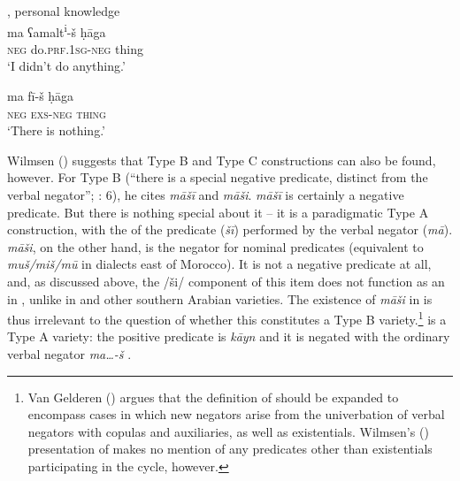 \documentclass[output=paper]{langsci/langscibook}
\begin{document}
\ea\label{cair}
{ , personal knowledge} \\
\ea\gll ma ʕamalt\textsuperscript{i}{}-š ḥāga\\
     \textsc{neg} do.\textsc{prf.1sg-neg} thing  \\
\glt ‘I didn’t do anything.’

\ex\gll ma fī-š ḥāga\\
     \textsc{neg} \textsc{exs-neg} \textsc{\textup{thing}}\\
\glt  ‘There is nothing.’
\z
\z

Wilmsen (\citeyear[173–175]{Wilmsen2014}) suggests that Type B and Type C constructions can also be found, however. For Type B (“there is a special negative  predicate, distinct from the verbal negator”; \citealt{Croft1991}: 6), he cites  \textit{māšī} and  \textit{māši}.  \textit{māšī} is certainly a negative  predicate. But there is nothing special about it – it is a paradigmatic Type A construction, with the  of the  predicate (\textit{šī}) performed by the verbal negator (\textit{mā}).  \textit{māši}, on the other hand, is the negator for nominal predicates (equivalent to \textit{muš/miš/mū} in dialects east of Morocco). It is not a negative  predicate at all, and, as discussed above, the /ši/ component of this item does not function as an  in , unlike in  and other southern Arabian varieties. The existence of \textit{m}\-\textit{āši} in   is thus irrelevant to the question of whether this constitutes a Type B variety.\footnote{Van Gelderen (\citeyear{VanGelderen2018}) argues that the definition of  should be expanded to encompass cases in which new negators arise from the univerbation of verbal negators with copulas and auxiliaries, as well as existentials. Wilmsen's (\citeyear{Wilmsen2014}) presentation of  makes no mention of any predicates other than existentials participating in the cycle, however.}   is a Type A variety: the positive  predicate is \textit{kāyn} and it is negated with the ordinary  verbal negator \textit{ma…-š} \citep{Caubet2011}.
\end{document}
